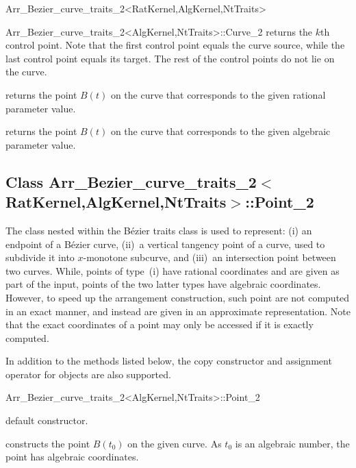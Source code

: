\begin{ccRefClass}{Arr_Bezier_curve_traits_2<RatKernel,AlgKernel,NtTraits>}
\begin{ccClass}{Arr_Bezier_curve_traits_2<AlgKernel,NtTraits>::Curve_2}
  {returns the $k$th control point. Note that the first control point equals
   the curve source, while the last control point equals its target. The rest
   of the control points do not lie on the curve.
   }

  {returns the point $B(t)$ on the curve that corresponds to the given
   rational parameter value.}

  {returns the point $B(t)$ on the curve that corresponds to the given
   algebraic parameter value.}

\end{ccClass}


\subsection*{Class
         Arr\_Bezier\_curve\_traits\_2$<$RatKernel,AlgKernel,NtTraits$>$::Point\_2}

The  class nested within the B\'ezier traits class is used
to represent: (i) an endpoint of a B\'ezier curve, (ii)~a vertical tangency
point of a curve, used to subdivide it into $x$-monotone subcurve, and
(iii)~an intersection point between two curves. While, points of type~(i) have
rational coordinates and are given as part of the input, points of the two
latter types have algebraic coordinates. However, to speed up the arrangement
construction, such point are not computed in an exact manner, and instead
are given in an approximate representation. Note that the exact coordinates
of a point may only be accessed if it is exactly computed.

In addition to the methods listed below, the copy constructor and assignment
operator for  objects are also supported.

\begin{ccClass}{Arr_Bezier_curve_traits_2<AlgKernel,NtTraits>::Point_2}

\ccCreation
{}

  {default constructor.}

  {constructs the point $B(t_0)$ on the given curve. As $t_0$ is an
   algebraic number, the point has algebraic coordinates.}


\end{ccClass}
\end{ccRefClass}

